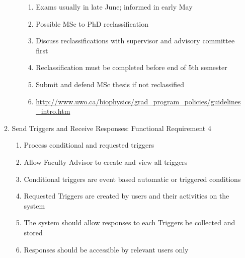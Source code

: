 \documentclass{journal}
\begin{document}
\begin{enumerate}
\begin{enumerate}
\begin{enumerate}
\begin{enumerate}
				\item Exams usually in late June; informed in early May
				\item Possible MSc to PhD reclassification
				\item Discuss reclassifications with supervisor and advisory committee first
				\item Reclassification must be completed before end of 5th semester
				\item Submit and defend MSc thesis if not reclassified
				\item \url{http://www.uwo.ca/biophysics/grad\_program\_policies/guidelines\_intro.htm}
				\end{enumerate}
				\end{enumerate}
				\item Send Triggers and Receive Responses: Functional Requirement 4
				\begin{enumerate}
				\item Process conditional and requested triggers
				\item Allow Faculty Advisor to create and view all triggers
				\item Conditional triggers are event based automatic or triggered conditions
				\item Requested Triggers are created by users and their activities on the system
				\item The system should allow responses to each Triggers be collected and stored
				\item Responses should be accessible by relevant users only 
				\end{enumerate}
				\end{enumerate}
				\end{enumerate}
\end{document}
